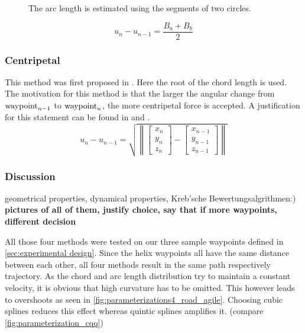 \begin{figure}[h]
\centering
\def\svgwidth{0.7\textwidth}

\caption{The arc length is estimated using the segments of two circles.}
\label{fig:arcLength}
\end{figure}

\begin{equation*}
u_n-u_{n-1}=\frac{B_a+B_b}{2}
\end{equation*}

\subsubsection{Centripetal}
This method was first proposed in \cite{lee}. Here the root of the chord length is used. The motivation for this method is that the larger the angular change from $\textnormal{waypoint}_{n-1}$ to $\textnormal{waypoint}_n$, the more centripetal force is accepted. A justification for this statement can be found in \cite{doessegger} and \cite{lee}.
\begin{equation*}
u_n-u_{n-1}=\sqrt{\left \| \begin{bmatrix}x_n\\y_n\\z_n \end{bmatrix}-\begin{bmatrix}x_{n-1}\\y_{n-1}\\z_{n-1} \end{bmatrix}\right \|}
\end{equation*}

\subsubsection{Discussion}

geometrical properties, dynamical properties, Kreb'sche Bewertungsalgrithmen:) \textbf{pictures of all of them, justify choice, say that if more waypoints, different decision}

All those four methods were tested on our three sample waypoints defined in \ref{sec:experimental design}. Since the helix waypoints all have the same distance between each other, all four methods result in the same path respectively trajectory. As the chord and arc length distribution try to maintain a constant velocity, it is obvious that high curvature has to be omitted. This however leads to overshoots as seen in \ref{fig:parameterizations4_road_agile}. Choosing cubic splines reduces this effect whereas quintic splines amplifies it. (compare \ref{fig:parameterization_cqq})

